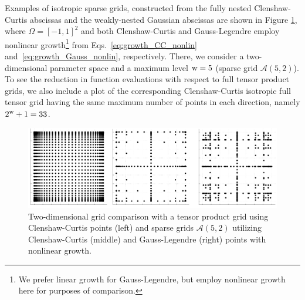 Examples of isotropic sparse grids, constructed from the fully nested 
Clenshaw-Curtis abscissas %
and the weakly-nested Gaussian abscissas %
are shown in Figure \ref{fig:isogrid_N2_q7}, where $\Omega=[-1,1]^2$
and both Clenshaw-Curtis and Gauss-Legendre employ nonlinear
growth\footnote{We prefer linear growth for Gauss-Legendre, but employ
nonlinear growth here for purposes of comparison.} from
Eqs.~\ref{eq:growth_CC_nonlin} and~\ref{eq:growth_Gauss_nonlin},
respectively.  There, we consider a two-dimensional parameter space
and a maximum level ${\rm w}=5$ (sparse grid $\mathscr{A}(5,2)$).  To
see the reduction in function evaluations with respect to full tensor
product grids, we also include a plot of the corresponding
Clenshaw-Curtis isotropic full tensor grid having the same maximum
number of points in each direction, namely $2^{\rm w}+1 = 33$.
%
\begin{figure}[h!]
\begin{center}
\includegraphics[width=6.5in]{images/isogrid_N2_q6}
\caption{Two-dimensional grid comparison with a tensor product grid
  using Clenshaw-Curtis points (left) and sparse grids
  $\mathscr{A}(5,2)$ utilizing Clenshaw-Curtis (middle) and
  Gauss-Legendre (right) points with nonlinear growth. }
\label{fig:isogrid_N2_q7}
\end{center}
\end{figure}

